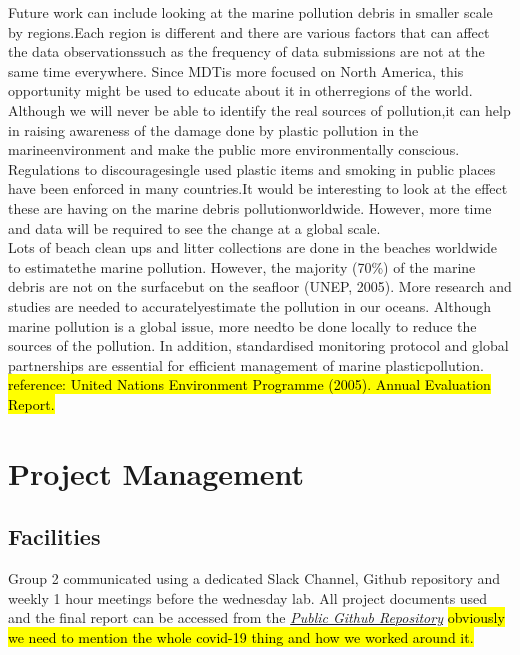 \documentclass[10pt]{article}\usepackage[]{graphicx}\usepackage[]{color}
\begin{document}
Future work can include looking at the marine pollution debris in smaller scale by regions.Each region is different and there are various factors that can affect the data observationssuch as the frequency of data submissions are not at the same time everywhere.  Since MDTis more focused on North America, this opportunity might be used to educate about it in otherregions of the world. Although we will never be able to identify the real sources of pollution,it can help in raising awareness of the damage done by plastic pollution in the marineenvironment and make the public more environmentally conscious. Regulations to discouragesingle used plastic items and smoking in public places have been enforced in many countries.It would be interesting to look at the effect these are having on the marine debris pollutionworldwide. However, more time and data will be required to see the change at a global scale. \\

Lots of beach clean ups and litter collections are done in the beaches worldwide to estimatethe marine pollution. However, the majority (70\%) of the marine debris are not on the surfacebut on the seafloor  (UNEP, 2005).  More research and studies are needed to accuratelyestimate the pollution in our oceans. Although marine pollution is a global issue, more needto be done locally to reduce the sources of the pollution. In addition, standardised monitoring protocol and global partnerships are   essential for efficient management of marine plasticpollution. \\

\hl{reference: United Nations Environment Programme (2005). Annual Evaluation Report.}



\pagebreak
\section{Project Management}\label{mgt}
\subsection{Facilities}
Group 2 communicated using a dedicated Slack Channel, Github repository and weekly 1 hour meetings before the wednesday lab.
All project documents used and the final report can be accessed from the \textit{\href{https://github.com/KarenJewell/CMM507Group2}{Public Github Repository}}
\hl{obviously we need to mention the whole covid-19 thing and how we worked around it.}
\end{document}
